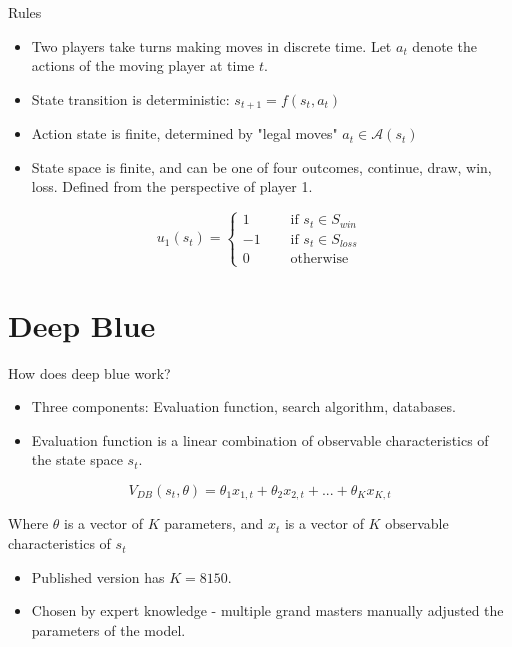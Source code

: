 \documentclass[presentation]{beamer}
\begin{document}
\begin{frame}[label={sec:orgb1df4f5}]{Rules}
\begin{itemize}
\item Two players take turns making moves in discrete time. Let \(a_t\)
denote the actions of the moving player at time \(t\).
\item State transition is deterministic: \(s_{t+1} = f( s_t, a_t )\)
\item Action state is finite, determined by "legal moves" \(a_t \in
  \mathcal{A}(s_t)\)
\item State space is finite, and can be one of four outcomes, continue,
draw, win, loss. Defined from the perspective of player 1.
\end{itemize}
\begin{equation*}
  u_1(s_t) =
  \begin{cases}
    1 \quad &\text{ if } s_t \in S_{win}\\
    -1  \quad &\text{ if } s_t \in S_{loss}\\
    0  \quad &\text{ otherwise }
  \end{cases}
\end{equation*}
\end{frame}


\section{Deep Blue}
\label{sec:orgdc8d6a0}
\begin{frame}[label={sec:org5a505a1}]{How does deep blue work?}
\begin{itemize}
\item Three components: Evaluation function, search algorithm, databases.
\item Evaluation function is a linear combination of observable
characteristics of the state space \(s_t\).
\end{itemize}

\begin{equation*}
  V_{DB}( s_t, \theta) = \theta_1 x_{1,t} + \theta_2 x_{2,t} + ... + \theta_K x_{K,t}
\end{equation*}

Where $\theta$ is a vector of $K$ parameters, and $x_t$ is a vector of $K$
observable characteristics of $s_t$

\begin{itemize}
\item Published version has \(K = 8150\).
\item Chosen by expert knowledge - multiple grand masters manually
adjusted the parameters of the model.
\end{itemize}
\end{frame}
\end{document}
